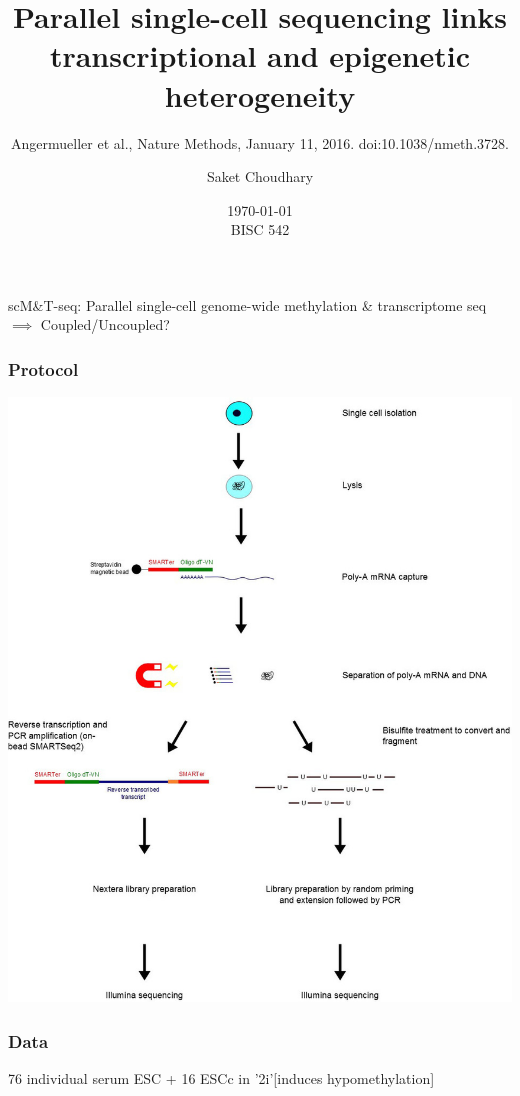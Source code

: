 \documentclass[10pt, compress]{beamer}
\title{Parallel single-cell sequencing links transcriptional and epigenetic heterogeneity
	}
\subtitle{Angermueller et al., Nature Methods, January 11, 2016. doi:10.1038/nmeth.3728.}
\author[skc]{Saket Choudhary}
\date{%
\today \\
BISC 542}
\renewcommand{\(}{\begin{columns}}
\renewcommand{\)}{\end{columns}}
\newcommand{\<}[1]{\begin{column}{#1}}
\renewcommand{\>}{\end{column}}
\begin{document}
\maketitle


\begin{frame}[fragile]
\begin{center}
\Large scM\&T-seq: Parallel single-cell genome-wide methylation \& transcriptome seq\\ 
$\implies$ Coupled/Uncoupled?
\end{center}
\end{frame}

\begin{frame}[fragile]
	\frametitle{Protocol}
	\begin{center}
	\includegraphics[width=\linewidth,height=\textheight,keepaspectratio]{images/protocol}
\end{center}
\end{frame}

\begin{frame}[fragile]
	\frametitle{Data}
	76 individual serum ESC + 16 ESCc in '2i'[induces hypomethylation]
\end{frame}
\end{document}
